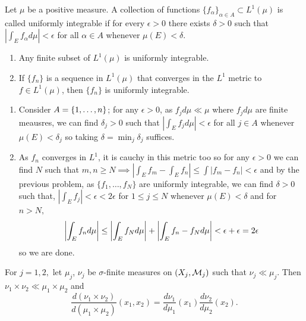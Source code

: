 \documentclass[12pt,a4paper]{article}
\begin{document}
\begin{problem}\label{prob:3-11}
Let $\mu$ be a positive measure. A collection of functions $\{f_{\alpha}\}_{\alpha\in A}\subset L^{1}(\mu)$ is called uniformly integrable if for every $\epsilon>0$ there exists $\delta>0$ such that $|\int_{E}f_{\alpha}d\mu|<\epsilon$ for all $\alpha\in A$ whenever $\mu(E)<\delta$.
\begin{enumerate}[label=\alph*.]
    \item Any finite subset of $L^{1}(\mu)$ is uniformly integrable.
    \item If $\{f_{n}\}$ is a sequence in $L^{1}(\mu)$ that converges in the $L^{1}$ metric to $f\in L^{1}(\mu)$, then $\{f_{n}\}$ is uniformly integrable.
\end{enumerate}
\end{problem}
\begin{solution}
\begin{enumerate}[label=\alph*.]
	\item Consider $A=\qty{1,\ldots,n}$; for any $\epsilon>0$, as $f_jd\mu\ll\mu$ where $f_jd\mu$ are finite meausres, we can find $\delta_j>0$ such that $|\int_{E}f_jd\mu|<\epsilon$ for all $j\in A$ whenever $\mu(E)<\delta_j$ so taking $\delta=\min_j\delta_j$ suffices.
	\item As $f_n$ converges in $L^1$, it is cauchy in this metric too so for any $\epsilon>0$ we can find $N$ such that $m,n\geq N\implies|\int_Ef_m-\int_Ef_n|\leq\int|f_m-f_n|<\epsilon$ and by the previous problem, as $\{f_1,\ldots,f_N\}$ are uniformly integrable, we can find $\delta>0$ such that, $|\int_E f_j|<\epsilon<2\epsilon$ for $1\leq j\leq N$ whenever $\mu(E)<\delta$ and for $n>N,$
		\[
		    \qty|\int_Ef_nd\mu|\leq\qty|\int_Ef_Nd\mu|+\qty|\int_Ef_n-f_Nd\mu|<\epsilon+\epsilon=2\epsilon
		\]
	so we are done.
\end{enumerate}
\end{solution}
\begin{problem}\label{prob:3-12}
For $j=1,2,$ let $\mu_{j}$, $\nu_{j}$ be $\sigma$-finite measures on $(X_{j},\mathcal{M}_{j})$ such that $\nu_{j}\ll\mu_{j}$. Then $\nu_{1}\times\nu_{2}\ll\mu_{1}\times\mu_{2}$ and
\[\frac{d(\nu_{1}\times\nu_{2})}{d(\mu_{1}\times\mu_{2})}(x_{1},x_{2})=\frac{d\nu_{1}}{d\mu_{1}}(x_{1})\frac{d\nu_{2}}{d\mu_{2}}(x_{2}).\]
\end{problem}
\end{document}
